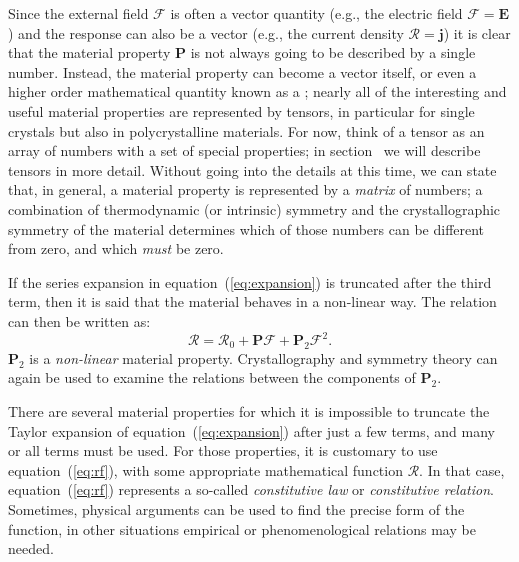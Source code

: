 Since the external field $\mathcal{F}$ is often a vector quantity (e.g., the electric field $\mathcal{F}=\mathbf{E}$) and the response can also be a vector (e.g., the current density $\mathcal{R}=\mathbf{j}$) it is clear that the material property $\mathbf{P}$ is not always going to be described by a single number.  Instead, the material property can become a vector itself, or even a higher order mathematical quantity known as a ; nearly all of the interesting and useful material properties are represented by tensors, in particular for single crystals but also in polycrystalline materials.  For now, think of a tensor as an array of numbers with a set of special properties; in section~ we will describe tensors in more detail.  Without going into the details at this time, we can state that, in general, a material property is represented by a \textit{matrix} of numbers; a combination of thermodynamic (or intrinsic) symmetry and the crystallographic symmetry of the material determines which of those numbers can be different from zero, and which \textit{must} be zero.  

If the series expansion in equation~(\ref{eq:expansion}) is truncated after the third term, then it is said that the material behaves in a non-linear way.  The relation can then be written as:
\begin{equation}
	\mathcal{R}=\mathcal{R}_0 + \mathbf{P}\mathcal{F} + 
	\mathbf{P}_2\mathcal{F}^2.
\end{equation}
$\mathbf{P}_2$ is a \textit{non-linear} material property.  Crystallography and symmetry theory can again be used to examine the relations between the components of $\mathbf{P}_2$.  
	
There are several material properties for which it is impossible to truncate the Taylor expansion of equation~(\ref{eq:expansion}) after just a few terms, and many or all terms must be used. For those properties, it is customary to use equation~(\ref{eq:rf}), with some appropriate mathematical function $\mathcal{R}$. In that case, equation~(\ref{eq:rf}) represents a so-called \textit{constitutive law} or \textit{constitutive relation}.  Sometimes, physical arguments can be used to find the precise form of the function, in other situations empirical or phenomenological relations may be needed.

